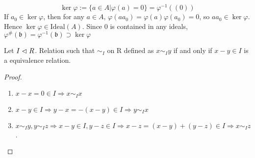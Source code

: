 \documentclass{amsart}
\begin{document}
\[
\ker \varphi:= \bigl\{ a \in A| \varphi(a)=0\bigr\}= \varphi^{-1}((0))
\]
If $a_0 \in \ker \varphi$, then for any $a \in A$, $\varphi(a a_0) = \varphi(a) \varphi(a_0) =0$, so $a a_0 \in \ker \varphi$. Hence $\ker \varphi \in \text{Ideal}(A)$.
Since $0$ is contained in any ideals, $\varphi^{\#}(\mathfrak{b})= \varphi^{-1}(\mathfrak{b}) \supset \ker \varphi$

\begin{seclemma}
	Let $I \vartriangleleft R$. Relation such that $\sim_{I}$ on R defined as $ x \sim_{I} y$ if and only if $x-y \in I$ is a equivalence relation.
\end{seclemma}
\begin{proof}
	
	\begin{enumerate}
		\item $x-x = 0 \in I \Rightarrow x \sim_{I} x$
		\item $x-y \in I \Rightarrow y-x = -(x-y) \in I \Rightarrow y \sim_{I}x$ 
		\item $x \sim_{I} y, y \sim_{I} z \Rightarrow x-y \in I, y-z \in I \Rightarrow x-z =(x-y) + (y-z) \in I \Rightarrow x \sim_{I} z$.
	\end{enumerate}
\end{proof}
\end{document}
